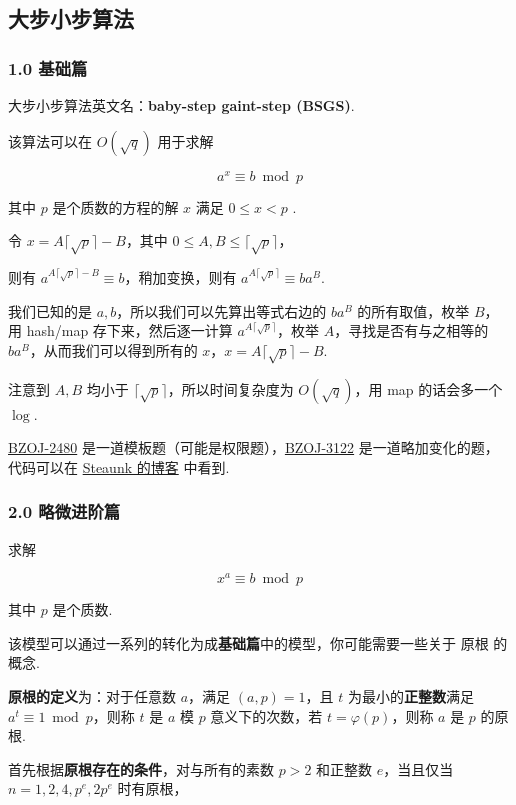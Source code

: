 
\subsection{大步小步算法}

\subsubsection{1.0 基础篇}

大步小步算法英文名：\textbf{baby-step gaint-step (BSGS)}.

该算法可以在 $O(\sqrt{q})$ 用于求解

$$
a^x \equiv b \bmod p
$$

其中 $p$ 是个质数的方程的解 $x$ 满足 $0 \le x < p$ .

令 $x = A \lceil \sqrt p \rceil - B$，其中 $0\le A,B \le \lceil \sqrt p \rceil$，

则有 $a^{A\lceil \sqrt p \rceil -B} \equiv b$，稍加变换，则有 $a^{A\lceil \sqrt p \rceil} \equiv ba^B$.

我们已知的是 $a,b$，所以我们可以先算出等式右边的 $ba^B$ 的所有取值，枚举 $B$，用 hash/map 存下来，然后逐一计算 $a^{A\lceil \sqrt p \rceil}$，枚举 $A$，寻找是否有与之相等的 $ba^B$，从而我们可以得到所有的 $x$，$x=A \lceil \sqrt p \rceil - B$.

注意到 $A,B$ 均小于 $\lceil \sqrt p \rceil$，所以时间复杂度为 $O(\sqrt q)$，用 map 的话会多一个 $\log$.

\href{http://www.lydsy.com/JudgeOnline/problem.php?id=2480}{BZOJ-2480} 是一道模板题（可能是权限题），\href{http://www.lydsy.com/JudgeOnline/problem.php?id=3122}{BZOJ-3122} 是一道略加变化的题，代码可以在 \href{https://blog.csdn.net/Steaunk/article/details/78988376}{Steaunk 的博客} 中看到.

\subsubsection{2.0 略微进阶篇}

求解

$$
x^a \equiv b \bmod p
$$

其中 $p$ 是个质数.

该模型可以通过一系列的转化为成\textbf{基础篇}中的模型，你可能需要一些关于  原根  的概念.

\textbf{原根的定义}为：对于任意数 $a$，满足 $(a,p)=1$，且 $t$ 为最小的\textbf{正整数}满足 $a^t \equiv 1 \bmod p$，则称 $t$ 是 $a$ 模 $p$ 意义下的次数，若 $t=\varphi(p)$，则称 $a$ 是 $p$ 的原根.

首先根据\textbf{原根存在的条件}，对与所有的素数 $p>2$ 和正整数 $e$，当且仅当 $n=1,2,4,p^e,2p^e$ 时有原根，

